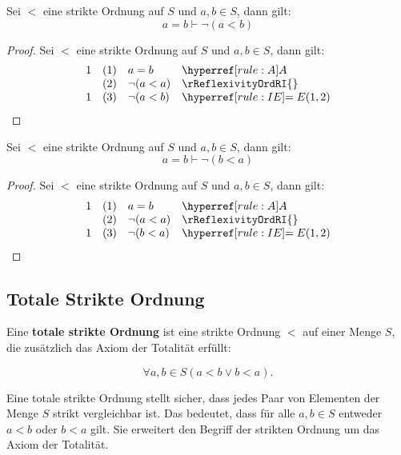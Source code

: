 \documentclass[main.tex]{subfiles}
\begin{document}
\label{aEqualsbImpnLpaLneqbRp}
\begin{theorem}[\(a=b\vdash \neg(a<b)\)]
Sei \(<\) eine strikte Ordnung auf \(S\) und \(a,b\in  S\), dann gilt:
\[a=b\vdash \neg(a<b)\]
\end{theorem}
\begin{proof}
    Sei \(<\) eine strikte Ordnung auf \(S\) und \(a,b\in  S\), dann gilt:
	\[
	\begin{array}{llll}
		1   & (1) & a=b & \rA\\
            & (2) & \neg(a<a) & \rReflexivityOrdRI{}\\
		1   & (3) & \neg(a<b) & \rIE{1,2}\\
	\end{array}
	\]
\end{proof}

\label{aEqualsbImpnLpbLneqaRp}
\begin{theorem}[\(a=b\vdash \neg(b<a)\)]
Sei \(<\) eine strikte Ordnung auf \(S\) und \(a,b\in  S\), dann gilt:
\[a=b\vdash \neg(b<a)\]
\end{theorem}
\begin{proof}
    Sei \(<\) eine strikte Ordnung auf \(S\) und \(a,b\in  S\), dann gilt:
	\[
	\begin{array}{llll}
		1   & (1) & a=b & \rA\\
            & (2) & \neg(a<a) & \rReflexivityOrdRI{}\\
		1   & (3) & \neg(b<a) & \rIE{1,2}\\
	\end{array}
	\]
\end{proof}

\subsection{Totale Strikte Ordnung}

\begin{definition}
    Eine \textbf{totale strikte Ordnung} ist eine strikte Ordnung \(<\) auf einer Menge \(S\), die zusätzlich das Axiom der Totalität erfüllt:
    
    \[
    \forall a, b \in S (a < b \lor b < a).
    \]
\end{definition}

\begin{remark}
    Eine totale strikte Ordnung stellt sicher, dass jedes Paar von Elementen der Menge \(S\) strikt vergleichbar ist. Das bedeutet, dass für alle \(a, b \in S\) entweder \(a < b\) oder \(b < a\) gilt. Sie erweitert den Begriff der strikten Ordnung um das Axiom der Totalität.
\end{remark}
\end{document}
